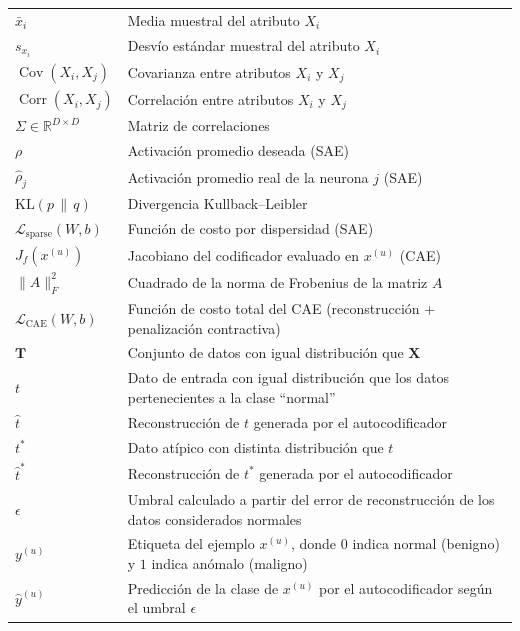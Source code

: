 \documentclass[a4paper,10pt]{book}
\begin{document}
\begin{table}[H]
\begin{tabular}{ll}
		$\bar{x}_i$ & Media muestral del atributo $X_i$ \\
		$s_{x_i}$ & Desvío estándar muestral del atributo $X_i$ \\
		$\operatorname{Cov}(X_i, X_j)$ & Covarianza entre atributos $X_i$ y $X_j$ \\
		$\operatorname{Corr}(X_i, X_j)$ & Correlación entre atributos $X_i$ y $X_j$ \\
		$\Sigma \in \mathbb{R}^{D \times D}$ & Matriz de correlaciones \\
		
		$\rho$ & Activación promedio deseada (SAE) \\
		$\hat{\rho}_j$ & Activación promedio real de la neurona $j$ (SAE) \\
		$\mathrm{KL}(p\,\|\,q)$ & Divergencia Kullback–Leibler \\
		$\mathcal{L}_{\text{sparse}}(W,b)$ & Función de costo por dispersidad (SAE) \\
		
		$J_f(x^{(u)})$ & Jacobiano del codificador evaluado en $x^{(u)}$ (CAE) \\
		$\|A\|_{F}^{2}$ & Cuadrado de la norma de Frobenius de la matriz $A$ \\
		$\mathcal{L}_{\text{CAE}}(W,b)$ & Función de costo total del CAE (reconstrucción + penalización contractiva) \\
		
		$\mathbf{T}$ & Conjunto de datos con igual distribución que $\mathbf{X}$ \\
		$t$ & Dato de entrada con igual distribución que los datos pertenecientes a la clase ``normal'' \\
		$\hat{t}$ & Reconstrucción de $t$ generada por el autocodificador \\
		$t^{*}$ & Dato atípico con distinta distribución que $t$ \\
		$\hat{t}^{*}$ & Reconstrucción de $t^{*}$ generada por el autocodificador \\
		$\epsilon$ & Umbral calculado a partir del error de reconstrucción de los datos considerados normales \\
		$y^{(u)}$ & Etiqueta del ejemplo $x^{(u)}$, donde $0$ indica normal (benigno) y $1$ indica anómalo (maligno) \\
		$\hat{y}^{(u)}$ & Predicción de la clase de $x^{(u)}$ por el autocodificador según el umbral $\epsilon$ \\
		\bottomrule
	\end{tabular}
\end{table}
\end{document}
